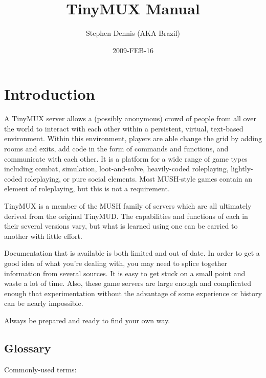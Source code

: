 \documentclass[10pt,letterpaper]{book}
\title{TinyMUX Manual}
\author{Stephen Dennis (AKA Brazil)}
\date{2009-FEB-16}
\begin{document}
\frontmatter
\maketitle
\tableofcontents

\mainmatter
\chapter{Introduction}
A TinyMUX server allows a (possibly anonymous) crowd of people from all over
the world to interact with each other within a persistent, virtual, text-based
environment.
Within this environment, players are able change the grid by adding rooms and
exits, add code in the form of commands and functions, and communicate with
each other.
It is a platform for a wide range of game types including combat, simulation,
loot-and-solve, heavily-coded roleplaying, lightly-coded roleplaying, or pure
social elements.
Most MUSH-style games contain an element of roleplaying, but this is not a
requirement.

TinyMUX is a member of the MUSH family of servers which are all ultimately
derived from the original TinyMUD.
The capabilities and functions of each in their several versions vary, but
what is learned using one can be carried to another with little effort.

Documentation that is available is both limited and out of date. In order to
get a good idea of what you're dealing with, you may need to splice together
information from several sources. It is easy to get stuck on a small point
and waste a lot of time.  Also, these game servers are large enough and
complicated enough that experimentation without the advantage of some
experience or history can be nearly impossible.

Always be prepared and ready to find your own way.

\section{Glossary}

Commonly-used terms:
\end{document}
